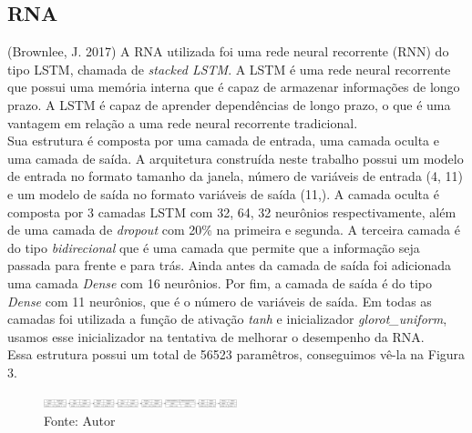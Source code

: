 \documentclass[
	article,			%
	11pt,				%
	a4paper,			%
	chapter=TITLE,		%
	section=TITLE,		%
	subsection=TITLE,	%
	subsubsection=TITLE %
	english,			%
	brazil,				%
	sumario=tradicional
	]{abntex2}
\begin{document}
\subsection{RNA}
(Brownlee, J. 2017) A RNA utilizada foi uma rede neural recorrente (RNN) do tipo LSTM, chamada de \textit{stacked LSTM}. A LSTM é uma rede neural recorrente que possui uma memória interna que é capaz de armazenar informações de longo prazo. A LSTM é capaz de aprender dependências de longo prazo, o que é uma vantagem em relação a uma rede neural recorrente tradicional.
\\ \indent
Sua estrutura é composta por uma camada de entrada, uma camada oculta e uma camada de saída. A arquitetura construída neste trabalho possui um modelo de entrada no formato tamanho da janela, número de variáveis de entrada (4, 11) e um modelo de saída no formato variáveis de saída (11,). A camada oculta é composta por 3 camadas LSTM com 32, 64, 32 neurônios respectivamente, além de uma camada de \textit{dropout} com 20\% na primeira e segunda. A terceira camada é do tipo \textit{bidirecional} que é uma camada que permite que a informação seja passada para frente e para trás. Ainda antes da camada de saída foi adicionada uma camada \textit{Dense} com 16 neurônios. Por fim, a camada de saída é do tipo \textit{Dense} com 11 neurônios, que é o número de variáveis de saída. Em todas as camadas foi utilizada a função de ativação \textit{tanh} e inicializador \textit{glorot\_uniform}, usamos esse inicializador na tentativa de melhorar o desempenho da RNA. 
\\ \indent
Essa estrutura possui um total de 56523 paramêtros, conseguimos vê-la na Figura 3.

\begin{figure}[htbp]
	\centering
	\includegraphics[width=0.5\textwidth]{imagens/imgCodigos/melhorLSTM.png}
	\caption{Fonte: Autor}
	\label{figure3}
\end{figure}
\end{document}
